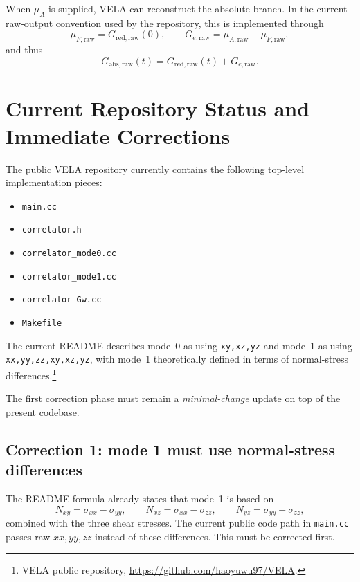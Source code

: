 \documentclass[11pt]{article}
\begin{document}
When $\mu_A$ is supplied, VELA can reconstruct the absolute branch. In the current raw-output convention used by the repository, this is implemented through
\begin{equation}
\mu_{F,\mathrm{raw}} = G_{\mathrm{red,raw}}(0), \qquad G_{e,\mathrm{raw}}=\mu_{A,\mathrm{raw}}-\mu_{F,\mathrm{raw}},
\end{equation}
and thus
\begin{equation}
G_{\mathrm{abs,raw}}(t)=G_{\mathrm{red,raw}}(t)+G_{e,\mathrm{raw}}.
\end{equation}

\section{Current Repository Status and Immediate Corrections}

The public VELA repository currently contains the following top-level implementation pieces:
\begin{itemize}[leftmargin=2em]
  \item \texttt{main.cc}
  \item \texttt{correlator.h}
  \item \texttt{correlator\_mode0.cc}
  \item \texttt{correlator\_mode1.cc}
  \item \texttt{correlator\_Gw.cc}
  \item \texttt{Makefile}
\end{itemize}
The current README describes mode~0 as using \texttt{xy,xz,yz} and mode~1 as using \texttt{xx,yy,zz,xy,xz,yz}, with mode~1 theoretically defined in terms of normal-stress differences.\footnote{VELA public repository, \url{https://github.com/haoyuwu97/VELA}.}

The first correction phase must remain a \emph{minimal-change} update on top of the present codebase.

\subsection{Correction 1: mode 1 must use normal-stress differences}

The README formula already states that mode~1 is based on
\begin{equation}
N_{xy}=\sigma_{xx}-\sigma_{yy},\qquad N_{xz}=\sigma_{xx}-\sigma_{zz},\qquad N_{yz}=\sigma_{yy}-\sigma_{zz},
\end{equation}
combined with the three shear stresses. The current public code path in \texttt{main.cc} passes raw $xx,yy,zz$ instead of these differences. This must be corrected first.
\end{document}
